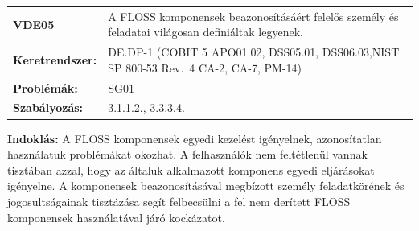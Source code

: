 \documentclass[12pt,magyar,a4paper,oneside]{scrreprt}
\begin{document}
\begin{longtable}[]{@{}ll@{}}
\toprule
\endhead
\begin{minipage}[t]{0.16\columnwidth}\raggedright
\textbf{VDE05}\strut
\end{minipage} & \begin{minipage}[t]{0.79\columnwidth}\raggedright
A FLOSS komponensek beazonosításáért felelős személy és feladatai
világosan definiáltak legyenek.\strut
\end{minipage}\tabularnewline
\begin{minipage}[t]{0.16\columnwidth}\raggedright
\textbf{Keretrendszer:}\strut
\end{minipage} & \begin{minipage}[t]{0.79\columnwidth}\raggedright
DE.DP-1 (COBIT 5 APO01.02, DSS05.01, DSS06.03,NIST SP 800-53 Rev.~4
CA-2, CA-7, PM-14)\strut
\end{minipage}\tabularnewline
\begin{minipage}[t]{0.16\columnwidth}\raggedright
\textbf{Problémák:}\strut
\end{minipage} & \begin{minipage}[t]{0.79\columnwidth}\raggedright
SG01\strut
\end{minipage}\tabularnewline
\begin{minipage}[t]{0.16\columnwidth}\raggedright
\textbf{Szabályozás:}\strut
\end{minipage} & \begin{minipage}[t]{0.79\columnwidth}\raggedright
3.1.1.2., 3.3.3.4.\strut
\end{minipage}\tabularnewline
\bottomrule
\end{longtable}

\textbf{Indoklás: } A FLOSS komponensek egyedi kezelést igényelnek,
azonosítatlan használatuk problémákat okozhat. A felhasználók nem
feltétlenül vannak tisztában azzal, hogy az általuk alkalmazott
komponens egyedi eljárásokat igényelne. A komponensek beazonosításával
megbízott személy feladatkörének és jogosultságainak tisztázása segít
felbecsülni a fel nem derített FLOSS komponensek használatával járó
kockázatot.
\end{document}
